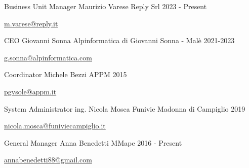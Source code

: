 

\begin{cventries}

\cventry
{Business Unit Manager} %
{Maurizio Varese} %
{Reply Srl} %
{2023 - Present} %
{
  \begin{cvitems} %
    \item {\href{mailto:m.varese@reply.it}{m.varese@reply.it}}
  \end{cvitems}
}

\cventry
{CEO} %
{Giovanni Sonna} %
{Alpinformatica di Giovanni Sonna - Malè} %
{2021-2023} %
{
  \begin{cvitems} %
    \item {\href{mailto:g.sonna@alpinformatica.com}{g.sonna@alpinformatica.com}}
  \end{cvitems}
}

  \cventry
    {Coordinator} %
    {Michele Bezzi} %
    {APPM} %
    {2015} %
    {
      \begin{cvitems} %
        \item {\href{mailto:pgvsole@appm.it}{pgvsole@appm.it}}
      \end{cvitems}
    }

  \cventry
    {System Administrator} %
    {ing. Nicola Mosca} %
    {Funivie Madonna di Campiglio} %
    {2019} %
    {
      \begin{cvitems} %
        \item {\href{mailto:nicola.mosca@funiviecampiglio.it}{nicola.mosca@funiviecampiglio.it}}
      \end{cvitems}
    }

  \cventry
    {General Manager} %
    {Anna Benedetti} %
    {MMape} %
    {2016 - Present} %
    {
      \begin{cvitems} %
        \item {\href{mailto:annabenedetti88@gmail.com}{annabenedetti88@gmail.com}}
      \end{cvitems}
    }
 
\end{cventries}

